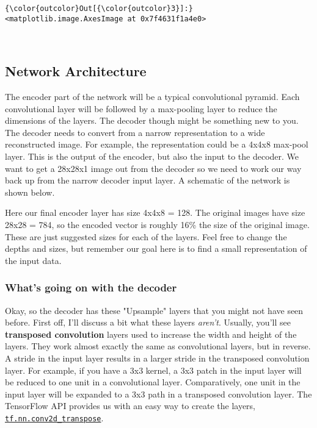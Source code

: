 \documentclass[11pt]{article}
\begin{document}
\begin{Verbatim}[commandchars=\\\{\}]
{\color{outcolor}Out[{\color{outcolor}3}]:} <matplotlib.image.AxesImage at 0x7f4631f1a4e0>
\end{Verbatim}
            
    \begin{center}
    \end{center}
    { \hspace*{\fill} \\}
    
    \subsection{Network Architecture}\label{network-architecture}

The encoder part of the network will be a typical convolutional pyramid.
Each convolutional layer will be followed by a max-pooling layer to
reduce the dimensions of the layers. The decoder though might be
something new to you. The decoder needs to convert from a narrow
representation to a wide reconstructed image. For example, the
representation could be a 4x4x8 max-pool layer. This is the output of
the encoder, but also the input to the decoder. We want to get a 28x28x1
image out from the decoder so we need to work our way back up from the
narrow decoder input layer. A schematic of the network is shown below.

Here our final encoder layer has size 4x4x8 = 128. The original images
have size 28x28 = 784, so the encoded vector is roughly 16\% the size of
the original image. These are just suggested sizes for each of the
layers. Feel free to change the depths and sizes, but remember our goal
here is to find a small representation of the input data.

\subsubsection{What's going on with the
decoder}\label{whats-going-on-with-the-decoder}

Okay, so the decoder has these "Upsample" layers that you might not have
seen before. First off, I'll discuss a bit what these layers
\emph{aren't}. Usually, you'll see \textbf{transposed convolution}
layers used to increase the width and height of the layers. They work
almost exactly the same as convolutional layers, but in reverse. A
stride in the input layer results in a larger stride in the transposed
convolution layer. For example, if you have a 3x3 kernel, a 3x3 patch in
the input layer will be reduced to one unit in a convolutional layer.
Comparatively, one unit in the input layer will be expanded to a 3x3
path in a transposed convolution layer. The TensorFlow API provides us
with an easy way to create the layers,
\href{https://www.tensorflow.org/api_docs/python/tf/nn/conv2d_transpose}{\texttt{tf.nn.conv2d\_transpose}}.
\end{document}
